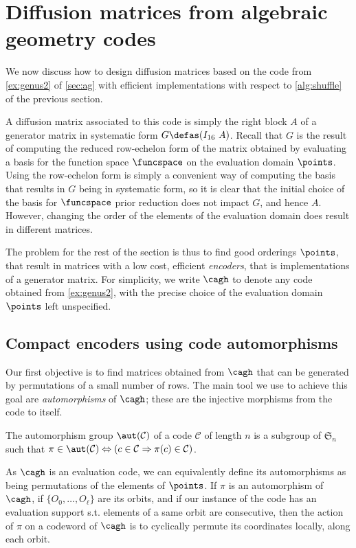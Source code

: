 \section{Diffusion matrices from algebraic geometry codes}
\label{matt}

We now discuss how to design diffusion matrices based on the code from \autoref{ex:genus2} of \autoref{sec:ag}
with efficient implementations with respect to \autoref{alg:shuffle} of the previous section.

A diffusion matrix associated to this code is simply the right block $A$ of a generator matrix in systematic form $G \defas (I_{16}~A)$.
Recall that $G$ is the result of computing the reduced row-echelon form of the matrix obtained by evaluating a basis for the
function space $\funcspace$
on the evaluation domain $\points$. Using the row-echelon form is simply a convenient way of computing the basis that results in $G$ being in systematic
form, so it is clear that the initial choice of the basis for $\funcspace$ prior reduction does not impact $G$, and hence $A$.
However, changing the order of the elements of the evaluation domain does result in different matrices.

The problem for the rest of the section is thus to find good orderings $\points$,
that result in matrices with a low cost, \ie efficient \emph{encoders}, that is implementations of a generator matrix.
For simplicity, we write $\cagh$ to denote any code obtained from \autoref{ex:genus2}, with the precise choice of the evaluation domain $\points$ left unspecified.


\subsection{Compact encoders using code automorphisms}
\label{sec:autos}

Our first objective is to find matrices obtained from $\cagh$ that can be generated by permutations of a small number of rows.
The main tool we use to achieve this goal are \emph{automorphisms} of $\cagh$; these are the injective morphisms from the code to itself.
\begin{defi}
The automorphism group $\aut(\mathcal{C})$ of a code $\mathcal{C}$ of length $n$ is a subgroup of $\mathfrak{S}_n$ such that
$\pi \in \aut(\mathcal{C}) \Leftrightarrow (c \in \mathcal{C} \Rightarrow \pi(c) \in \mathcal{C})$.
\end{defi}

As $\cagh$ is an evaluation code, we can equivalently define its automorphisms as being permutations of the elements of $\points$.
If $\pi$ is an automorphism of $\cagh$, if $\{O_0, \ldots, O_\ell\}$ are its orbits, and if our instance of the code
has an evaluation support s.t. elements of a same orbit are consecutive,
then the action of $\pi$ on a codeword of $\cagh$
is to cyclically permute its coordinates locally, along each orbit.

